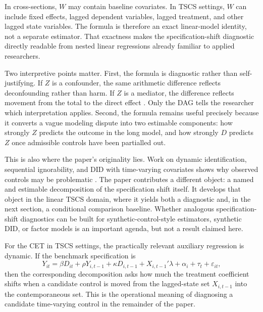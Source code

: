 \documentclass[
]{article}
\begin{document}
In cross-sections, \(W\) may contain baseline covariates. In TSCS
settings, \(W\) can include fixed effects, lagged dependent variables,
lagged treatment, and other lagged state variables. The formula is
therefore an exact linear-model identity, not a separate estimator. That
exactness makes the specification-shift diagnostic directly readable
from nested linear regressions already familiar to applied researchers.

Two interpretive points matter. First, the formula is diagnostic rather
than self-justifying. If \(Z\) is a confounder, the same arithmetic
difference reflects deconfounding rather than harm. If \(Z\) is a
mediator, the difference reflects movement from the total to the direct
effect \citep{acharya_etal2016}. Only the DAG tells the researcher which
interpretation applies. Second, the formula remains useful precisely
because it converts a vague modeling dispute into two estimable
components: how strongly \(Z\) predicts the outcome in the long model,
and how strongly \(D\) predicts \(Z\) once admissible controls have been
partialled out.

This is also where the paper's originality lies. Work on dynamic
identification, sequential ignorability, and DID with time-varying
covariates shows why observed controls may be problematic
\citep{blackwell2018make, imai_kim2021, caetano_callaway2024}. The paper
contributes a different object: a named and estimable decomposition of
the specification shift itself. It develops that object in the linear
TSCS domain, where it yields both a diagnostic and, in the next section,
a conditional comparison baseline. Whether analogous specification-shift
diagnostics can be built for synthetic-control-style estimators,
synthetic DID, or factor models is an important agenda, but not a result
claimed here.

For the CET in TSCS settings, the practically relevant auxiliary
regression is dynamic. If the benchmark specification is
\begin{equation}
Y_{it} = \beta D_{it} + \rho Y_{i,t-1} + \kappa D_{i,t-1} + X_{i,t-1}'\lambda + \alpha_i + \tau_t + \varepsilon_{it},
\label{eq:benchmark_pa}
\end{equation} then the corresponding decomposition asks how much the
treatment coefficient shifts when a candidate control is moved from the
lagged-state set \(X_{i,t-1}\) into the contemporaneous set. This is the
operational meaning of diagnosing a candidate time-varying control in
the remainder of the paper.
\end{document}

